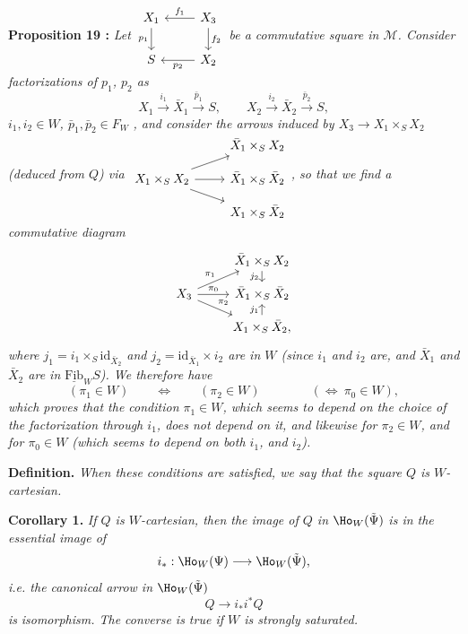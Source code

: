 \textbf{Proposition 19 :} \textit{Let $\begin{tikzcd}[ampersand replacement=\&] X_1 \arrow[d, "p_1"'] \& X_3 \arrow[l, "f_1"'] \arrow[d, "f_2"] \\ S \& X_2 \arrow[l, "p_2"] \end{tikzcd}$ be a commutative square in $\mathcal{M}$. Consider factorizations of $p_1$, $p_2$ as}
\[
X_1\xrightarrow{\ i_1\ }\bar{X}_1\xrightarrow{\ \bar{p}_1\ }S,\qquad X_2\xrightarrow{\ i_2\ }\bar{X}_2\xrightarrow{\ \bar{p}_2\ }S,
\]
\textit{$i_1,i_2\in W$, $\bar{p}_1,\bar{p}_2\in F_W$} \textit{, and consider the arrows induced by $X_3\longrightarrow X_1\times_S X_2$ (deduced from $Q$) via $\begin{tikzcd}[ampersand replacement=\&, row sep=small] \& \bar{X}_1\times_S X_2 \\ X_1\times_S X_2 \arrow[ur] \arrow[r] \arrow[dr] \& \bar{X}_1\times_S\bar{X}_2 \\ \& X_1\times_S\bar{X}_2 \end{tikzcd}$, so that we find a commutative diagram}
\[
\begin{tikzcd}[ampersand replacement=\&, row sep=small]
\& \bar{X}_1\times_S X_2 \arrow[d, "j_2"'] \\
X_3 \arrow[ur, "\pi_1"] \arrow[r, "\pi_0"] \arrow[dr, "\pi_2"] \& \bar{X}_1\times_S\bar{X}_2 \\
\& X_1\times_S\bar{X}_2, \arrow[u, "j_1"]
\end{tikzcd}
\]
\textit{where $j_1=i_1\times_S\mathrm{id}_{\bar{X}_2}$ and $j_2=\mathrm{id}_{\bar{X}_1}\times i_2$ are in $W$ (since $i_1$ and $i_2$ are, and $\bar{X}_1$ and $\bar{X}_2$ are in $\underline{\mathrm{Fib}}_W S$). We therefore have}
\[
(\pi_1\in W)\qquad\iff\qquad(\pi_2\in W)\qquad\qquad(\iff\ \pi_0\in W),
\]
\textit{which proves that the condition $\pi_1\in W$, which seems to depend on the choice of the factorization through $i_1$, does not depend on it, and likewise for $\pi_2\in W$, and for $\pi_0\in W$ (which seems to depend on both $i_1$, and $i_2$).}


\textbf{Definition.} \textit{When these conditions are satisfied, we say that the square $Q$ is $W$-cartesian.}

\textbf{Corollary 1.} \textit{If $Q$ is $W$-cartesian, then the image of $Q$ in} $\Ho_W(\tilde{\Psi})$ \textit{is in the essential image of}
\[
i_* : \Ho_W(\Psi)\longrightarrow\Ho_W(\tilde{\Psi}),
\]
\textit{i.e. the canonical arrow in} $\Ho_W(\tilde{\Psi})$
\[
Q\longrightarrow i_*i^*Q
\]
\textit{is} \textit{isomorphism. The converse is true if $W$ is strongly saturated.}

